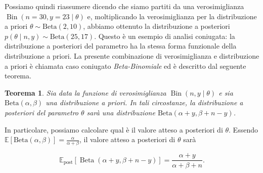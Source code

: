 \documentclass[
]{memoir}
\DeclareMathOperator{\Bin}{Bin} %
\DeclareMathOperator{\Beta}{Beta} %
\newcommand{\E}{\mathbb{E}} %
\newtheorem{theorem}{Teorema}[chapter]
\theoremstyle{definition}
\theoremstyle{definition}
\theoremstyle{definition}
\theoremstyle{definition}
\theoremstyle{remark}
\begin{document}
Possiamo quindi riassumere dicendo che siamo partiti da una verosimiglianza \(\Bin(n = 30, y = 23 \mid \theta)\) e, moltiplicando la verosimiglianza per la distribuzione a priori \(\theta \sim \text{Beta}(2, 10)\), abbiamo ottenuto la distribuzione a posteriori \(p(\theta \mid n, y) \sim \text{Beta}(25, 17)\). Questo è un esempio di analisi coniugata: la distribuzione a posteriori del parametro ha la stessa forma funzionale della distribuzione a priori. La presente combinazione di verosimiglianza e distribuzione a priori è chiamata caso coniugato \emph{Beta-Binomiale} ed è descritto dal seguente teorema.

\begin{theorem}
\protect\hypertarget{thm:beta-binom}{}\label{thm:beta-binom}Sia data la funzione di verosimiglianza \(\Bin(n, y \mid \theta)\) e sia \(\text{Beta}(\alpha, \beta)\) una distribuzione a priori. In tali circostanze, la distribuzione a posteriori del parametro \(\theta\) sarà una distribuzione \(\text{Beta}(\alpha + y, \beta + n - y)\).
\end{theorem}

\noindent
In particolare, possiamo calcolare qual è il valore atteso a posteriori di \(\theta\). Essendo \(\E[\text{Beta}(\alpha, \beta)] = \frac{\alpha}{\alpha + \beta}\), il valore atteso a posteriori di \(\theta\) sarà

\begin{equation}
\E_{\text{post}} [\Beta(\alpha + y, \beta + n - y)] = \frac{\alpha + y}{\alpha + \beta +n}.
\label{eq:ev-post-beta-bin-1}
\end{equation}
\end{document}
